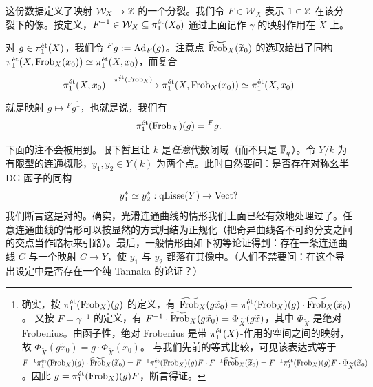 这份数据定义了映射 $\mathcal{W}_X \to \ZZ$ 的一个分裂。我们令 $F \in \mathcal{W}_X$ 表示 $1 \in \ZZ$ 在该分裂下的像。按定义，$F^{-1} \in \mathcal{W}_X \subseteq \pi_1^{\et}(X_0)$ 通过上面记作 $\gamma$ 的映射作用在 $\widetilde{X}$ 上。

对 $g \in \pi_1^{\et}(X)$，我们令 ${}^F g := \Ad_F(g)$。注意点 $\widetilde{\Frob}_X(\widetilde{x}_0)$ 的选取给出了同构 $\pi_1^{\et}(X,\Frob_X(x_0)) \simeq \pi_1^{\et}(X,x_0)$，而复合
\[
  \pi_1^{\et}(X,x_0) \xrightarrow{\ \pi_1^{\et}(\Frob_X)\ } \pi_1^{\et}(X,\Frob_X(x_0)) \simeq \pi_1^{\et}(X,x_0)
\]
就是映射 $g \mapsto {}^F g$\footnote{确实，按 $\pi_1^{\et}(\Frob_X)(g)$ 的定义，有 $\widetilde{\Frob}_X(g\widetilde{x}_0) = \pi_1^{\et}(\Frob_X)(g) \cdot \widetilde{\Frob}_X(\widetilde{x}_0)$。
  又按 $F = \gamma^{-1}$ 的定义，有 $F^{-1}\cdot\widetilde{\Frob}_X(g\widetilde{x}_0) = \Phi_{\widetilde{X}}(g\widetilde{x})$，其中 $\Phi_{\widetilde{X}}$ 是绝对 Frobenius。由函子性，绝对 Frobenius 是带 $\pi_1^{\et}(X)$-作用的空间之间的映射，故 $\Phi_{\widetilde{X}}(g\widetilde{x}_0) = g \cdot \Phi_{\widetilde{X}}(\widetilde{x}_0)$。
  与我们先前的等式比较，可见该表达式等于 $F^{-1}\pi_1^{\et}(\Frob_X)(g) \cdot \widetilde{\Frob}_X(\widetilde{x}_0) = F^{-1}\pi_1^{\et}(\Frob_X)(g)F \cdot F^{-1}\widetilde{\Frob}_X(\widetilde{x}_0) = F^{-1}\pi_1^{\et}(\Frob_X)(g)F \cdot \Phi_{\widetilde{X}}(\widetilde{x}_0)$。因此 $g = \pi_1^{\et}(\Frob_X)(g)F$，断言得证。%
  }，也就是说，我们有
\begin{equation}
  \pi_1^{\et}(\Frob_X)(g) = {}^F g.
\end{equation}


\begin{remark}
下面的注不会被用到。眼下暂且让 $k$ 是\emph{任意}代数闭域（而不只是 $\overline{\F}_q$）。令 $Y/k$ 为有限型的连通概形，$y_1, y_2 \in Y(k)$ 为两个点。此时自然要问：是否存在对称幺半 DG 函子的同构
\[
  y_1^* \simeq y_2^* : \qLisse(Y) \to \Vect ?
\]
我们断言这是对的。确实，光滑连通曲线的情形我们上面已经有效地处理过了。任意连通曲线的情形可以按显然的方式归结为正规化（把奇异曲线各不可约分支之间的交点当作路标来引路）。最后，一般情形由如下初等论证得到：存在一条连通曲线 $C$ 与一个映射 $C \to Y$，使 $y_1$ 与 $y_2$ 都落在其像中。（人们不禁要问：在这个导出设定中是否存在一个纯 Tannaka 的论证？）
\end{remark}

